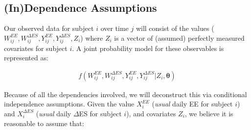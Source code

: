 \documentclass[11pt]{article}\usepackage[]{graphicx}\usepackage[]{color}
\begin{document}
%  

\subsection{(In)Dependence Assumptions}

 Our observed data for subject $i$ over time $j$ will consist of the values ({\bf$W_{ij}^{EE},W_{ij}^{\Delta ES}, Y_{ij}^{EE},Y_{ij}^{\Delta ES}, Z_i$}) where $Z_i$ is a vector of (assumed) perfectly measured covariates for subject $i$. A joint probability model for these observables is represented as:

\begin{align}
  f(W_{ij}^{EE},W_{ij}^{\Delta ES}, Y_{ij}^{EE},Y_{ij}^{\Delta ES}|Z_i,\boldsymbol{\theta})
  \label{fullmodel}
\end{align}

Because of all the dependencies involved, we will deconstruct this via conditional independence assumptions. Given the value $X_i^{EE}$ (\emph{usual} daily EE for subject $i$) and $X_i^{\Delta ES}$ (\emph{usual} daily $\Delta$ES for subject $i$), and covariates $Z_i$, we believe it is reasonable to assume that:
\end{document}
